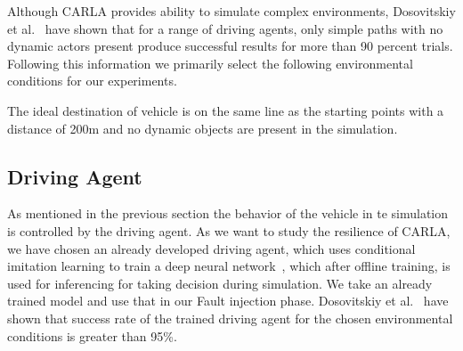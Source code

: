 Although CARLA provides ability to simulate complex environments, Dosovitskiy et al.~\cite{Dosovitskiy17} have shown that for a range of driving agents, only simple paths with no dynamic actors present produce successful results for more than 90 percent trials. Following this information we primarily select the following environmental conditions for our experiments. 

The ideal destination of vehicle is on the same line as the starting points with a distance of 200m and no dynamic objects are present in the simulation.

\subsection{Driving Agent}
As mentioned in the previous section the behavior of the vehicle in te simulation is controlled by the driving agent. As we want to study the resilience of CARLA, we have chosen an already developed driving agent, which uses conditional imitation learning to train a deep neural network~\cite{Codevilla2018}, which after offline training, is used for inferencing for taking decision during simulation. We take an already trained model and use that in our Fault injection phase. Dosovitskiy et al.~\cite{Dosovitskiy17} have shown that success rate of the trained driving agent for the chosen environmental conditions is greater than 95\%.